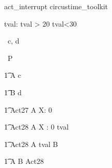 \begin{zsection}
   \SECTION act\_interrupt \parents circustime\_toolkit
\end{zsection}


\begin{axdef}
   tval: \nat
\where
   tval > 20 \land tval<30
\end{axdef}


\begin{circus}
   \circchannel\ c, d \\
\end{circus}

\begin{circus}
    \circprocess\ P \circdef \circbegin \\
\end{circus}


\begin{circusaction}
    	\t1 A \circdef c \then \Skip \\
\end{circusaction}

\begin{circusaction}
        \t1 B \circdef d \then \Skip \\
\end{circusaction}


\begin{circusaction}
    	\t1 Act27 \circdef A \circendby   \lcirctime X: 0  \rcirctime \\
\end{circusaction}

\begin{circusaction}
    	\t1 Act28 \circdef  A \circendby \lcirctime X : 0 \upto tval \rcirctime \\
\end{circusaction}

\begin{circusaction}
    	\t1 Act28 \circdef  A \circendby {} \upto tval \rcirctime B \\
\end{circusaction}


\begin{circusaction}        
        \t1 \circspot A \circseq B \extchoice Act28\\
\end{circusaction}

\begin{circus}    
\circend
\end{circus}
